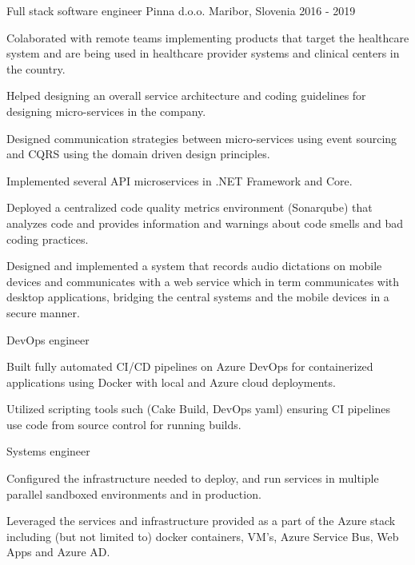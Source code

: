\begin{cventries}
  \cventry
    {Full stack software engineer} %
    {Pinna d.o.o.} %
    {Maribor, Slovenia} %
    {2016 - 2019} %
    {
      \begin{cvitems} %
        \item {Colaborated with remote teams implementing products that 
        target the healthcare system and are being used in healthcare
         provider systems and clinical centers in the country.}
        \item {Helped designing an overall service architecture 
        and coding guidelines for designing micro-services in the company.}
        \item {Designed communication strategies between micro-services 
        using event sourcing and CQRS using the domain driven design principles.}
        \item {Implemented several API microservices in .NET Framework and Core.}
        \item {Deployed a centralized code quality metrics environment 
        (Sonarqube) that analyzes code and provides information and 
        warnings about code smells and bad coding practices.}
        \item {Designed and implemented a system that records audio 
        dictations on mobile devices and communicates with a web 
        service which in term communicates with desktop applications,
         bridging the central systems and the mobile devices in a secure manner.}
      \end{cvitems}
    }
    \cventry
    {DevOps engineer} %
    {} %
    {} %
    {} %
    {
      \begin{cvitems} %
        \item {Built fully automated CI/CD pipelines on Azure
         DevOps for containerized applications using Docker with local 
         and Azure cloud deployments.}
        \item {Utilized scripting tools such (Cake Build, DevOps yaml) 
        ensuring CI pipelines use code from source control for running builds.\\}
      \end{cvitems}
    }
    \cventry
    {Systems engineer} %
    {} %
    {} %
    {} %
    {
      \begin{cvitems} %
        \item {Configured the infrastructure needed to deploy, 
        and run services in multiple parallel sandboxed environments 
        and in production.}
        \item {Leveraged the services and infrastructure provided as a
         part of the Azure stack including (but not limited to) 
         docker containers, VM's, Azure Service Bus, Web Apps and Azure AD.\\}
      \end{cvitems}
    }


\end{cventries}
